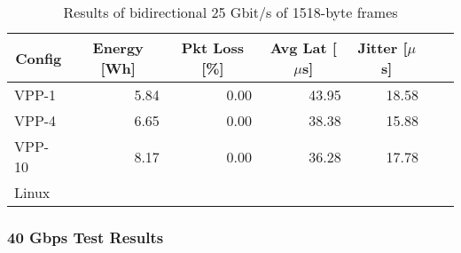 \begin{table}[h!]
\centering
\caption{Results of bidirectional 25 Gbit/s of 1518-byte frames}
\begin{tabular}{|l|r|r|r|r|r|r|}
\hline
\multicolumn{1}{|c|}{\textbf{Config}} &
\multicolumn{1}{c|}{\textbf{Energy [Wh] }} &
\multicolumn{1}{c|}{\textbf{Pkt Loss [\%]}} &
\multicolumn{1}{c|}{\textbf{Avg Lat [$\mu$s]}} &
\multicolumn{1}{c|}{\textbf{Jitter [$\mu$s]}} \\
\hline 
VPP-1 & 5.84 & 0.00 & 43.95 & 18.58 \\
VPP-4 & 6.65 & 0.00 & 38.38 & 15.88 \\
VPP-10 & 8.17 & 0.00 & 36.28 & 17.78 \\
Linux &  &  &  &  \\
\hline
\end{tabular}
\label{tab:25budp:1518B}
\end{table}



\subsubsection{40 Gbps Test Results}



